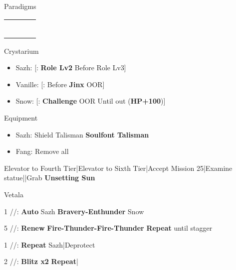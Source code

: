 \begin{menu}
	\item Paradigms
	\begin{tabular}{cccl}
		\syn          & \sab & \rav          &  \\
		\com          & \med & \com          &          \\
		\syn          & \med & \com          &          \\
		\com          & \sab & \com          &          \\
		\chrole{\rav} & \sab & \chrole{\rav} &          \\
		\com          & \rav & \com          &
	\end{tabular}
	\item Crystarium
	\begin{itemize}
		\item Sazh: [\rav: \textbf{Role Lv2} \to Before Role Lv3]
		\item Vanille: [\sab: Before \textbf{Jinx} OOR]
		\item Snow: [\sen: \textbf{Challenge} OOR \to Until out (\textbf{HP+100})]
	\end{itemize}
	\item Equipment
	\begin{itemize}
		\item Sazh: Shield Talisman \to \textbf{Soulfont Talisman}
		\item Fang: Remove all
	\end{itemize}
\end{menu}
\begin{mainlist}
	\item Elevator to Fourth Tier|Elevator to Sixth Tier|Accept Mission 25|Examine statue|\skip|Grab \textbf{Unsetting Sun}
\end{mainlist}
\begin{fight}{Vetala}
	\item [1] \syn/\sab/\rav: \textbf{Auto} Sazh \to \textbf{Bravery-Enthunder} Snow
	\item [5] \rav/\sab/\rav: \textbf{Renew} \to \textbf{Fire-Thunder-Fire-Thunder} \to \textbf{Repeat} until stagger
	\item [1] \syn/\sab/\rav: \textbf{Repeat} Sazh|Deprotect
	\item [2] \com/\med/\com: \textbf{Blitz x2} \to \textbf{Repeat}|\skip
\end{fight}
